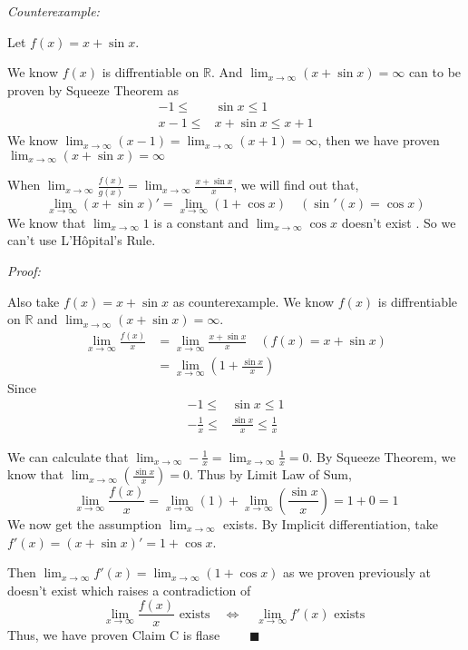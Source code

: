 \documentclass[12pt]{exam}
\newcommand*\circled[1]{\tikz[baseline=(char.base)]{
    \node[shape=circle, draw, inner sep=1pt, 
        minimum height=12pt] (char) {#1};}}
\newcommand{\R}{\mathbb{R}}
\begin{document}
\begin{enumerate}
\begin{enumerate}
			\emph{Counterexample:}
			
			Let $f(x)=x+\sin{x}$.
			
			We know $f(x)$ is diffrentiable on $\R$.
			And $\lim_{x \to \infty}(x+\sin{x})=\infty$ can to be proven by Squeeze Theorem as
			\begin{align*}
			    -1\leq&\sin{x}\leq 1\\
			    x-1\leq&x+\sin{x}\leq x+1
			\end{align*}
			We know $\lim_{x \to \infty}(x-1)=\lim_{x \to \infty}(x+1)=\infty$, then we have proven $\lim_{x \to \infty}(x+\sin{x})=\infty$ \circled{6}
			
			When $\lim_{x \to \infty}\frac{f(x)}{g(x)}=\lim_{x \to \infty}\frac{x+\sin{x}}{x}$, we will find out that,
			$$
			    \lim_{x \to \infty}(x+\sin{x})'=\lim_{x \to \infty}(1+\cos{x})\quad(\sin'(x)=\cos{x})
			$$
			We know that $\lim_{x \to \infty}1$ is a constant and $\lim_{x \to \infty}\cos{x}$ doesn't exist \circled{7}. So we can't use L'H\^{o}pital's Rule.
			
			\emph{Proof:}
			
			Also take $f(x)=x+\sin{x}$ as counterexample.
			We know $f(x)$ is diffrentiable on $\R$ and $\lim_{x \to \infty}(x+\sin{x})=\infty$. \circled{6}
			\begin{align*}
			    \lim_{x \to \infty}\frac{f(x)}{x}&=\lim_{x \to \infty}\frac{x+\sin{x}}{x}\quad(f(x)=x+\sin{x})\\
			    &=\lim_{x \to \infty}(1+\frac{\sin{x}}{x})
			\end{align*}
			Since
		    \begin{align*}
		        -1\leq&\sin{x}\leq1\\
		        -\frac{1}{x}\leq&\frac{\sin{x}}{x}\leq\frac{1}{x}
		     \end{align*}
		
		    We can calculate that $\lim_{x \to \infty}-\frac{1}{x}=\lim_{x \to \infty}\frac{1}{x}=0$. By Squeeze Theorem, we know that $\lim_{x \to \infty}(\frac{\sin{x}}{x})=0$. Thus by     Limit Law of Sum,
		    $$
		        \lim_{x \to \infty} \frac{f(x)}{x}=\lim_{x \to \infty}(1)+\lim_{x \to \infty}(\frac{\sin{x}}{x})=1+0=1
		    $$
		    We now get the assumption $\lim_{x \to \infty}$ exists. By Implicit differentiation, take $f'(x)=(x+\sin{x})'=1+\cos{x}$.
		    
		    Then $\lim_{x \to \infty}f'(x)=\lim_{x \to \infty}(1+\cos{x})$ as we proven previously at \circled{7} doesn't exist which raises a contradiction of
		    $$
		        \lim_{x \to \infty} \frac{f(x)}{x} \mbox{ exists} \quad \iff \quad \lim_{x \to \infty} f'(x) \mbox{ exists }
		    $$
		    Thus, we have proven Claim C is flase $\qquad\blacksquare$
		    
	\end{enumerate}

\end{enumerate}
\end{document}
